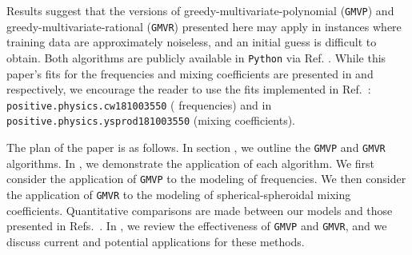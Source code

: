 \documentclass[twocolumn,aps,prd,floatfix,preprintnumbers,a4paper,nofootinbib,
superscriptaddress,10pt]{revtex4-1}
\def\gmvp#1{greedy-multivariate-polynomial#1
  (\texttt{GMVP}#1)\gdef\gmvp{\texttt{GMVP}}}
\def\gmvr#1{greedy-multivariate-rational#1
  (\texttt{GMVR}#1)\gdef\gmvr{\texttt{GMVR}}}
\begin{document}
%
Results suggest that the versions of \gmvp{} and \gmvr{} presented here may apply in instances where training data are approximately noiseless, and an initial guess is difficult to obtain.
%
Both algorithms are publicly available in \texttt{Python} via Ref. \cite{lionel_london_2018_1402516}.
%
While this paper's fits for the \qnm{} frequencies and mixing coefficients are presented in  and   respectively, we encourage the reader to use the fits implemented in Ref.~\cite{lionel_london_2018_1402516}: \texttt{positive.physics.cw181003550} (\qnm{} frequencies) and in \texttt{positive.physics.ysprod181003550} (mixing coefficients).
%
%
\par The plan of the paper is as follows.
%
In section , we outline the \gmvp{} and \gmvr{} algorithms.
%
In , we demonstrate the application of each algorithm.
%
We first consider the application of \gmvp{} to the modeling of \qnm{} frequencies.
%
We then consider the application of \gmvr{} to the modeling of spherical-spheroidal mixing coefficients.
%
Quantitative comparisons are made between our models and those presented in Refs.~\cite{Berti:2005ys, Berti:2014fga}.
%
In , we review the effectiveness of \gmvp{} and \gmvr{}, and we discuss current and potential applications for these methods.
%
%
\end{document}
